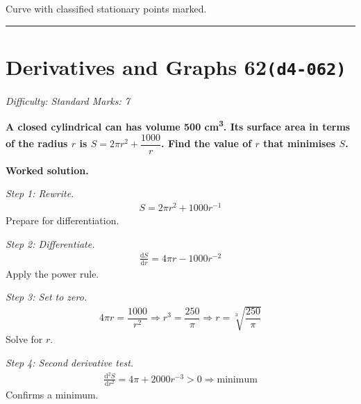 \documentclass[11pt]{article}
\newcommand{\question}[1]{\par\medskip\noindent\textbf{#1}\par}
\begin{document}
\begin{center}
{
}
\end{center}
\small Curve with classified stationary points marked.\normalsize

\medskip\hrule

\section*{Derivatives and Graphs 62\quad\small\texttt{(d4-062)}}
\textit{Difficulty: Standard \quad\textbar\quad Marks: 7}

\question{A closed cylindrical can has volume 500 cm\textsuperscript{3}. Its surface area in terms of the radius \( r \) is \( S = 2\pi r^2 + \dfrac{1000}{r} \). Find the value of \( r \) that minimises \( S \).}

\textbf{Worked solution.}

\textit{Step 1: Rewrite.}
\[\begin{gathered}
S = 2\pi r^2 + 1000 r^{-1}
\end{gathered}\]
Prepare for differentiation.

\textit{Step 2: Differentiate.}
\[\begin{gathered}
\frac{\mathrm{d}S}{\mathrm{d}r} = 4\pi r - 1000 r^{-2}
\end{gathered}\]
Apply the power rule.

\textit{Step 3: Set to zero.}
\[\begin{gathered}
4\pi r = \dfrac{1000}{r^2} \Rightarrow r^3 = \dfrac{250}{\pi} \Rightarrow r = \sqrt[3]{\dfrac{250}{\pi}}
\end{gathered}\]
Solve for \( r \).

\textit{Step 4: Second derivative test.}
\[\begin{gathered}
\frac{\mathrm{d}^2S}{\mathrm{d}r^2} = 4\pi + 2000 r^{-3} > 0 \Rightarrow \text{minimum}
\end{gathered}\]
Confirms a minimum.
\end{document}
